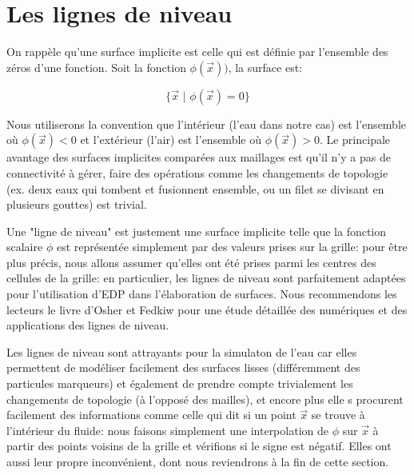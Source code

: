 \documentclass[11pt]{report}
\begin{document}
\section{Les lignes de niveau}

On rappèle qu'une surface implicite est celle qui est définie par l'ensemble des zéros d'une fonction. Soit la fonction $\phi(\overrightarrow{x}))$, la surface est:

\begin{equation}
\{\overrightarrow{x} \,\, | \,\, \phi(\overrightarrow{x}) = 0\}
\end{equation}

Nous utiliserons la convention que l'intérieur (l'eau dans notre cas) est l'ensemble où $\phi(\overrightarrow{x}) < 0$ et l'extérieur (l'air) est l'ensemble où $\phi(\overrightarrow{x}) > 0$. Le principale avantage des surfaces implicites comparées aux maillages est qu'il n'y a pas de connectivité à gérer, faire des opérations comme les changements de topologie (ex. deux eaux qui tombent et fusionnent ensemble, ou un filet se divisant en plusieurs gouttes) est trivial.\newline

Une "ligne de niveau" est justement une surface implicite telle que la fonction scalaire $\phi$ est représentée simplement par des valeurs prises sur la grille: pour être plus précis, nous allons assumer qu'elles ont été prises parmi les centres des cellules de la grille: en particulier, les lignes de niveau sont parfaitement adaptées pour l'utilisation d'EDP dans l'élaboration de surfaces. Nous recommendons les lecteurs le livre d'Osher et Fedkiw \cite{osher-fedkiw-2002} pour une étude détaillée des numériques et des applications des lignes de niveau.\newline

Les lignes de niveau sont attrayants pour la simulaton de l'eau car elles permettent de modéliser facilement des surfaces lisses (différemment des particules marqueurs) et également de prendre compte trivialement les changements de topologie (à l'opposé des mailles), et encore plus elle s procurent facilement des informations comme celle qui dit si un point $\overrightarrow{x}$ se trouve à l'intérieur du fluide: nous faisons simplement une interpolation de $\phi$ sur $\overrightarrow{x}$ à partir des points voisins de la grille et vérifions si le signe est négatif. Elles ont aussi leur propre inconvénient, dont nous reviendrons à la fin de cette section.\newline
\end{document}

